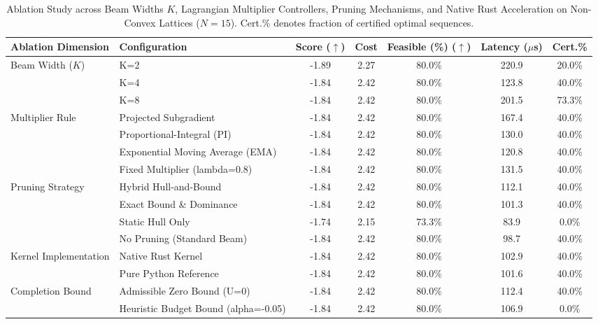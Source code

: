\begin{table}[t]
\centering
\small
\caption{Ablation Study across Beam Widths $K$, Lagrangian Multiplier Controllers, Pruning Mechanisms, and Native Rust Acceleration on Non-Convex Lattices ($N=15$). Cert.\% denotes fraction of certified optimal sequences.}
\label{tab:ablations}
\begin{tabular}{llccccc}
\toprule
Ablation Dimension & Configuration & Score ($\uparrow$) & Cost & Feasible (\%) ($\uparrow$) & Latency ($\mu$s) & Cert.\% \\
\midrule
Beam Width ($K$) & K=2 & -1.89 & 2.27 & 80.0\% & 220.9 & 20.0\% \\
 & K=4 & -1.84 & 2.42 & 80.0\% & 123.8 & 40.0\% \\
 & K=8 & -1.84 & 2.42 & 80.0\% & 201.5 & 73.3\% \\
\midrule
Multiplier Rule & Projected Subgradient & -1.84 & 2.42 & 80.0\% & 167.4 & 40.0\% \\
 & Proportional-Integral (PI) & -1.84 & 2.42 & 80.0\% & 130.0 & 40.0\% \\
 & Exponential Moving Average (EMA) & -1.84 & 2.42 & 80.0\% & 120.8 & 40.0\% \\
 & Fixed Multiplier (lambda=0.8) & -1.84 & 2.42 & 80.0\% & 131.5 & 40.0\% \\
\midrule
Pruning Strategy & Hybrid Hull-and-Bound & -1.84 & 2.42 & 80.0\% & 112.1 & 40.0\% \\
 & Exact Bound \& Dominance & -1.84 & 2.42 & 80.0\% & 101.3 & 40.0\% \\
 & Static Hull Only & -1.74 & 2.15 & 73.3\% & 83.9 & 0.0\% \\
 & No Pruning (Standard Beam) & -1.84 & 2.42 & 80.0\% & 98.7 & 40.0\% \\
\midrule
Kernel Implementation & Native Rust Kernel & -1.84 & 2.42 & 80.0\% & 102.9 & 40.0\% \\
 & Pure Python Reference & -1.84 & 2.42 & 80.0\% & 101.6 & 40.0\% \\
\midrule
Completion Bound & Admissible Zero Bound (U=0) & -1.84 & 2.42 & 80.0\% & 112.4 & 40.0\% \\
 & Heuristic Budget Bound (alpha=-0.05) & -1.84 & 2.42 & 80.0\% & 106.9 & 0.0\% \\
\bottomrule
\end{tabular}
\end{table}
